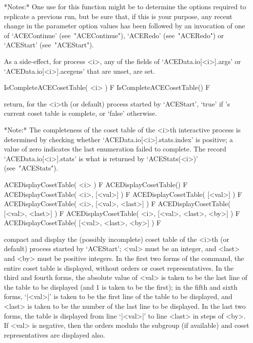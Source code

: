 *Notes:*
One use for this function might be to determine the  options  required
to replicate a previous run,  but  be  sure  that,  if  this  is  your
purpose, any recent change in the parameter  option  values  has  been
followed by an invocation of one of `ACEContinue' (see~"ACEContinue"),
`ACERedo' (see~"ACERedo") or `ACEStart' (see~"ACEStart").

As a side-effect, for  {\ACE}  process  <i>,  any  of  the  fields  of
`ACEData.io[<i>].args' or `ACEData.io[<i>].acegens'  that  are  unset,
are set.

\>IsCompleteACECosetTable( <i> ) F
\>IsCompleteACECosetTable() F

return, for the <i>th (or  default)  process  started  by  `ACEStart',
`true' if  {\ACE}'s  current  coset  table  is  complete,  or  `false'
otherwise.

*Note:*
The completeness of the coset table of the  <i>th  interactive  {\ACE}
process      is       determined       by       checking       whether
`ACEData.io[<i>].stats.index' is positive; a value of  zero  indicates
the   last   enumeration    failed    to    complete.    The    record
`ACEData.io[<i>].stats'  is  what  is  returned   by   `ACEStats(<i>)'
(see~"ACEStats").

\>ACEDisplayCosetTable( <i> ) F
\>ACEDisplayCosetTable() F
\>ACEDisplayCosetTable( <i>, [<val>] ) F
\>ACEDisplayCosetTable( [<val>] ) F
\>ACEDisplayCosetTable( <i>, [<val>, <last>] ) F
\>ACEDisplayCosetTable( [<val>, <last>] ) F
\>ACEDisplayCosetTable( <i>, [<val>, <last>, <by>] ) F
\>ACEDisplayCosetTable( [<val>, <last>, <by>] ) F

compact and display the (possibly incomplete) coset table of the <i>th
(or default) process started by `ACEStart'; <val> must be an  integer,
and <last> and <by> must be positive integers. In the first two  forms
of the command, the entire coset table is displayed, without orders or
coset representatives. In the third and  fourth  forms,  the  absolute
value of <val> is taken to be  the  last  line  of  the  table  to  be
displayed (and 1 is taken to be the first); in  the  fifth  and  sixth
forms, `|<val>|' is taken to be the first line  of  the  table  to  be
displayed, and <last> is taken to be the number of the last line to be
displayed. In the last two forms, the table  is  displayed  from  line
`|<val>|' to line <last> in steps of <by>. If <val> is negative,  then
the  orders   modulo   the   subgroup   (if   available)   and   coset
representatives are displayed also.


